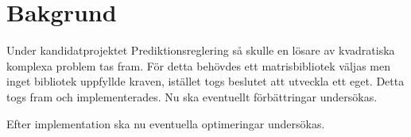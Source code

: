 \section{Bakgrund}
Under kandidatprojektet Prediktionsreglering så skulle en lösare av kvadratiska komplexa problem tas fram. För detta behövdes ett matrisbibliotek väljas men inget bibliotek uppfyllde kraven, istället togs beslutet att utveckla ett eget. Detta togs fram och implementerades. Nu ska eventuellt förbättringar undersökas.

Efter implementation ska nu eventuella optimeringar undersökas. 

